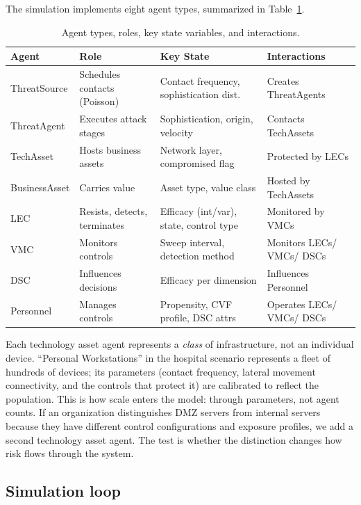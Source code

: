 \documentclass[11pt,a4paper]{article}
\begin{document}
The simulation implements eight agent types, summarized in Table~\ref{tab:agents}.

\begin{table}[htbp]
\centering
\caption{Agent types, roles, key state variables, and interactions.}
\label{tab:agents}
\small
\begin{tabularx}{\textwidth}{l l X X}
\toprule
\textbf{Agent} & \textbf{Role} & \textbf{Key State} & \textbf{Interactions} \\
\midrule
ThreatSource & Schedules contacts (Poisson) & Contact frequency, sophistication dist. & Creates ThreatAgents \\
ThreatAgent & Executes attack stages & Sophistication, origin, velocity & Contacts TechAssets \\
TechAsset & Hosts business assets & Network layer, compromised flag & Protected by LECs \\
BusinessAsset & Carries value & Asset type, value class & Hosted by TechAssets \\
LEC & Resists, detects, terminates & Efficacy (int/var), state, control type & Monitored by VMCs \\
VMC & Monitors controls & Sweep interval, detection method & Monitors LECs/ VMCs/ DSCs \\
DSC & Influences decisions & Efficacy per dimension & Influences Personnel \\
Personnel & Manages controls & Propensity, CVF profile, DSC attrs & Operates LECs/ VMCs/ DSCs \\
\bottomrule
\end{tabularx}
\end{table}

Each technology asset agent represents a \emph{class} of infrastructure, not an individual device. ``Personal Workstations'' in the hospital scenario represents a fleet of hundreds of devices; its parameters (contact frequency, lateral movement connectivity, and the controls that protect it) are calibrated to reflect the population. This is how scale enters the model: through parameters, not agent counts. If an organization distinguishes DMZ servers from internal servers because they have different control configurations and exposure profiles, we add a second technology asset agent. The test is whether the distinction changes how risk flows through the system.

\subsection{Simulation loop}
\end{document}
